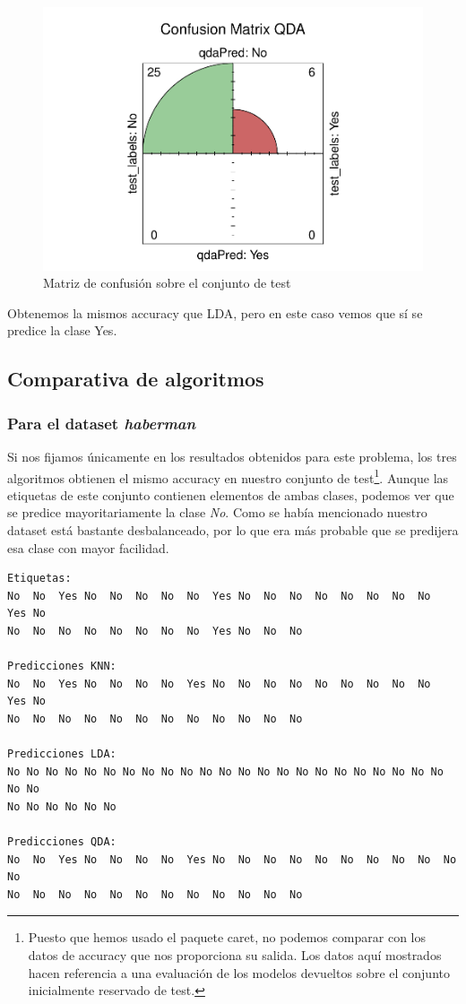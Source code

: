\begin{figure}[H]\center\includegraphics[width=.9\linewidth]{img/Clasificacion_files/figure-latex/unnamed-chunk-29-1}\caption{Matriz de confusión sobre el conjunto de test}\end{figure}

Obtenemos la mismos accuracy que LDA, pero en este caso vemos que sí se predice la clase Yes.

\subsection{Comparativa de algoritmos}
\subsubsection{Para el dataset \textit{haberman}}

Si nos fijamos únicamente en los resultados obtenidos para este problema, los tres algoritmos obtienen el mismo accuracy en nuestro conjunto de test\footnote{Puesto que hemos usado el paquete caret, no podemos comparar con los datos de accuracy que nos proporciona su salida. Los datos aquí mostrados hacen referencia a una evaluación de los modelos devueltos sobre el conjunto inicialmente reservado de test.}. Aunque las etiquetas de este conjunto contienen elementos de ambas clases, podemos ver que se predice mayoritariamente la clase \textit{No}. Como se había mencionado nuestro dataset está bastante desbalanceado, por lo que era más probable que se predijera esa clase con mayor facilidad.

\begin{verbatim}
Etiquetas:
No  No  Yes No  No  No  No  No  Yes No  No  No  No  No  No  No  No  Yes No 
No  No  No  No  No  No  No  No  Yes No  No  No 

Predicciones KNN:
No  No  Yes No  No  No  No  Yes No  No  No  No  No  No  No  No  No  Yes No 
No  No  No  No  No  No  No  No  No  No  No  No 

Predicciones LDA:
No No No No No No No No No No No No No No No No No No No No No No No No No
No No No No No No

Predicciones QDA:
No  No  Yes No  No  No  No  Yes No  No  No  No  No  No  No  No  No  No  No 
No  No  No  No  No  No  No  No  No  No  No  No 
\end{verbatim}

